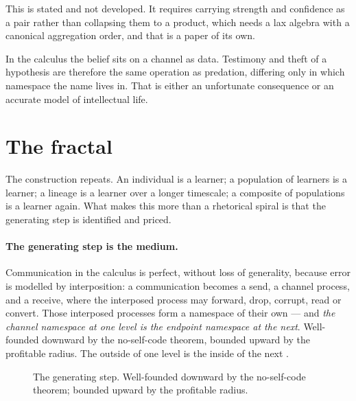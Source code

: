This is stated and not developed. It requires carrying strength and confidence as
a pair rather than collapsing them to a product, which needs a lax algebra with a
canonical aggregation order, and that is a paper of its own.

\begin{remark}
In the calculus the belief sits on a channel as data. Testimony and theft of a
hypothesis are therefore the same operation as predation, differing only in which
namespace the name lives in. That is either an unfortunate consequence or an
accurate model of intellectual life.
\end{remark}

\section{The fractal}
\label{sec:fractal}

The construction repeats. An individual is a learner; a population of learners is
a learner; a lineage is a learner over a longer timescale; a composite of
populations is a learner again. What makes this more than a rhetorical spiral is
that the generating step is identified and priced.

\paragraph{The generating step is the medium.} Communication in the calculus is
perfect, without loss of generality, because error is modelled by interposition: a
communication becomes a send, a channel process, and a receive, where the
interposed process may forward, drop, corrupt, read or convert. Those interposed
processes form a namespace of their own --- and \emph{the channel namespace at one
level is the endpoint namespace at the next}. Well-founded downward by the
no-self-code theorem, bounded upward by the profitable radius. The outside of one
level is the inside of the next \cite{EngineNote}.

\begin{figure}[h]
\centering
{}
\caption{The generating step. Well-founded downward by the no-self-code theorem;
bounded upward by the profitable radius.}
\label{fig:tower}
\end{figure}

